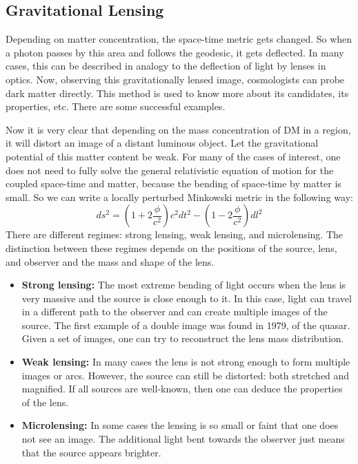 \documentclass[12pt]{report}
\begin{document}

\subsection{Gravitational Lensing}
Depending on matter concentration, the space-time metric gets changed. So when a photon passes by this area and follows the geodesic, it gets deflected. In many cases, this can be described in analogy to the deflection of light by lenses in optics. Now, observing this gravitationally lensed image, cosmologists can probe dark matter directly. This method is used to know more about its candidates, its properties, etc. There are some successful examples. \cite{glensing}

Now it is very clear that depending on the mass concentration of DM in a region, it will distort an image of a distant luminous object. Let the gravitational potential of this matter content be weak. For many of the cases of interest, one does not need to fully solve the general relativistic equation of motion for the coupled space-time and matter, because the bending of space-time by matter is small. So we can write a locally perturbed Minkowski metric in the following way: $$ds^2=\left(1+2\frac{\phi}{c^2}\right)c^2dt^2-\left(1-2\frac{\phi}{c^2}\right)dl^2$$ \cite{dmtheory1} \cite{dmtheory2}
There are different regimes: strong lensing, weak lensing, and microlensing. The distinction between these regimes depends on the positions of the source, lens, and observer and the mass and shape of the lens. 
\begin{itemize}
\item \textbf{Strong lensing:} The most extreme bending of light occurs when the lens is very massive and the source is close enough to it. In this case, light can travel in a different path to the observer and can create multiple images of the source. The first example of a double image was found in 1979, of the quasar. Given a set of images, one can try to reconstruct the lens mass distribution.


\item \textbf{Weak lensing:} In many cases the lens is not strong enough to form multiple images or arcs. However, the source can still be distorted: both stretched and magnified. If all sources are well-known, then one can deduce the properties of the lens.

\item \textbf{Microlensing:} In some cases the lensing is so small or faint that one does not see an image. The additional light bent towards the observer just means that the source appears brighter.
\end{itemize}
\end{document}
